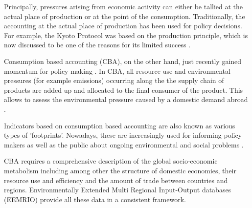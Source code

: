 Principally, pressures arising from economic activity can either be tallied at
the actual place of production or at the point of the consumption.
Traditionally, the accounting at the actual place of production has been used
for policy decisions. For example, the Kyoto Protocol was based on the
production principle, which is now discussed to be one of the reasons for its
limited success \cite{23192129}. 

Consumption based accounting (CBA), on the other hand, just recently gained
momentum for policy making \cite{Harris_2013}. In CBA, all resource use and environmental
pressures (for example emissions) occurring along the the supply chain of
products are added up and allocated to the final consumer of the product. This
allows to assess the environmental pressure caused by a domestic
demand abroad \cite{Weinzettel_2013, 20212122}.

Indicators based on consumption based accounting are also known as various
types of 'footprints'. Nowadays, these are increasingly used for informing policy makers as
well as the public about ongoing environmental \cite{tukker_global_2014, steen-olsen_carbon_2012, Kanemoto_2014}\cite{united_nations_university_inclusive_2012}
and social problems \cite{Simas_2014}. 

CBA requires a comprehensive description of the global socio-economic
metabolism including among other the structure of domestic economies, their
resource use and efficiency and the amount of trade between countries and regions.
Environmentally Extended Multi Regional Input-Output databases (EEMRIO) provide
all these data in a consistent framework. 